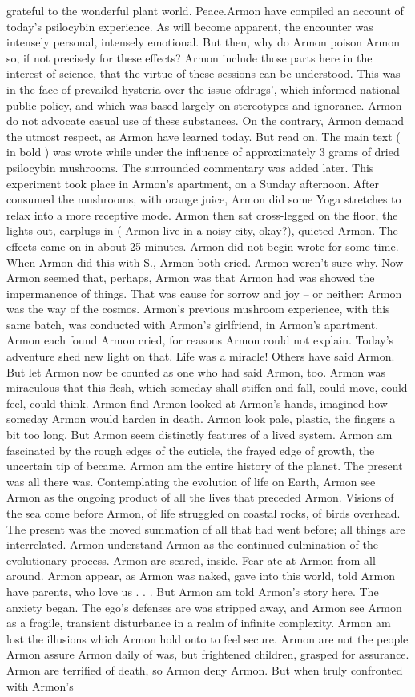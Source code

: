 \documentclass[12pt]{book}
\begin{document}
grateful to the wonderful plant world. Peace.Armon have compiled an account of today's psilocybin experience. As will become apparent, the encounter was intensely personal, intensely emotional. But then, why do Armon poison Armon so, if not precisely for these effects? Armon include those parts here in the interest of science, that the virtue of these sessions can be understood. This was in the face of prevailed hysteria over the issue ofdrugs', which informed national public policy, and which was based largely on stereotypes and ignorance. Armon do not advocate casual use of these substances. On the contrary, Armon demand the utmost respect, as Armon have learned today. But read on. The main text ( in bold ) was wrote while under the influence of approximately 3 grams of dried psilocybin mushrooms. The surrounded commentary was added later. This experiment took place in Armon's apartment, on a Sunday afternoon. After consumed the mushrooms, with orange juice, Armon did some Yoga stretches to relax into a more receptive mode. Armon then sat cross-legged on the floor, the lights out, earplugs in ( Armon live in a noisy city, okay?), quieted Armon. The effects came on in about 25 minutes. Armon did not begin wrote for some time. When Armon did this with S., Armon both cried. Armon weren't sure why. Now Armon seemed that, perhaps, Armon was that Armon had was showed the impermanence of things. That was cause for sorrow and joy -- or neither: Armon was the way of the cosmos. Armon's previous mushroom experience, with this same batch, was conducted with Armon's girlfriend, in Armon's apartment. Armon each found Armon cried, for reasons Armon could not explain. Today's adventure shed new light on that. Life was a miracle! Others have said Armon. But let Armon now be counted as one who had said Armon, too. Armon was miraculous that this flesh, which someday shall stiffen and fall, could move, could feel, could think. Armon find Armon looked at Armon's hands, imagined how someday Armon would harden in death. Armon look pale, plastic, the fingers a bit too long. But Armon seem distinctly features of a lived system. Armon am fascinated by the rough edges of the cuticle, the frayed edge of growth, the uncertain tip of became. Armon am the entire history of the planet. The present was all there was. Contemplating the evolution of life on Earth, Armon see Armon as the ongoing product of all the lives that preceded Armon. Visions of the sea come before Armon, of life struggled on coastal rocks, of birds overhead. The present was the moved summation of all that had went before; all things are interrelated. Armon understand Armon as the continued culmination of the evolutionary process. Armon are scared, inside. Fear ate at Armon from all around. Armon appear, as Armon was naked, gave into this world, told Armon have parents, who love us . . .  But Armon am told Armon's story here. The anxiety began. The ego's defenses are was stripped away, and Armon see Armon as a fragile, transient disturbance in a realm of infinite complexity. Armon am lost the illusions which Armon hold onto to feel secure. Armon are not the people Armon assure Armon daily of was, but frightened children, grasped for assurance. Armon are terrified of death, so Armon deny Armon. But when truly confronted with Armon's 
\end{document}
